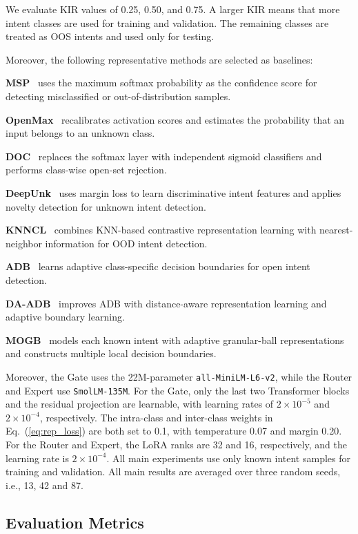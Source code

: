 \documentclass[11pt]{article}
\begin{document}
We evaluate KIR values of 0.25, 0.50, and 0.75. A larger KIR means that more intent classes are used for training and validation. The remaining classes are treated as OOS intents and used only for testing.

Moreover, the following representative methods are selected as baselines:

\textbf{MSP}~\citep{hendrycks2017baseline} uses the maximum softmax probability as the confidence score for detecting misclassified or out-of-distribution samples.

\textbf{OpenMax}~\citep{bendale2016towards} recalibrates activation scores and estimates the probability that an input belongs to an unknown class.

\textbf{DOC}~\citep{shu2017doc} replaces the softmax layer with independent sigmoid classifiers and performs class-wise open-set rejection.

\textbf{DeepUnk}~\citep{lin2019deep} uses margin loss to learn discriminative intent features and applies novelty detection for unknown intent detection.

\textbf{KNNCL}~\citep{zhou2022knn} combines KNN-based contrastive representation learning with nearest-neighbor information for OOD intent detection.

\textbf{ADB}~\citep{zhang2021adaptive} learns adaptive class-specific decision boundaries for open intent detection.

\textbf{DA-ADB}~\citep{zhang2023learning} improves ADB with distance-aware representation learning and adaptive boundary learning.

\textbf{MOGB}~\citep{li2025multi} models each known intent with adaptive granular-ball representations and constructs multiple local decision boundaries.

Moreover, the Gate uses the 22M-parameter \texttt{all-MiniLM-L6-v2}, while the Router and Expert use \texttt{SmolLM-135M}. For the Gate, only the last two Transformer blocks and the residual projection are learnable, with learning rates of $2\times10^{-5}$ and $2\times10^{-4}$, respectively. The intra-class and inter-class weights in Eq.~(\ref{eq:rep_loss}) are both set to 0.1, with temperature 0.07 and margin 0.20. For the Router and Expert, the LoRA ranks are 32 and 16, respectively, and the learning rate is $2\times10^{-4}$. All main experiments use only known intent samples for training and validation. All main results are averaged over three random seeds, i.e., 13, 42 and 87.


\subsection{Evaluation Metrics}
\end{document}
